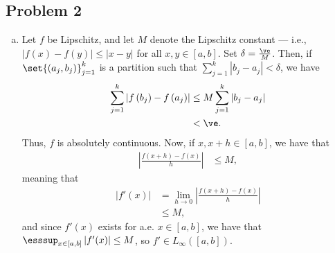 \documentclass[10pt]{mypackage}
\begin{document}
\subsection{Problem 2}%
\begin{enumerate}[(a)]
  \item Let $f$ be Lipschitz, and let $M$ denote the Lipschitz constant --- i.e., $\left\vert f(x)-f(y) \right\vert\leq \left\vert x-y \right\vert$ for all $x,y\in [a,b]$. Set $\delta = \frac{\ve}{M}$. Then, if $\set{\left( a_j,b_j \right)}_{j=1}^{k}$ is a partition such that $\sum_{j=1}^{k}\left\vert b_j-a_j \right\vert < \delta$, we have
    \begin{align*}
      \sum_{j=1}^{k} \left\vert f\left(b_j\right)-f\left( a_j \right) \right\vert &\leq M\sum_{j=1}^{k} \left\vert b_j-a_j \right\vert\\
                                                                                  &< \ve.
    \end{align*}
    Thus, $f$ is absolutely continuous. Now, if $x,x+h\in [a,b]$, we have that
    \begin{align*}
      \left\vert \frac{f\left( x+h \right)-f\left( x \right)}{h} \right\vert &\leq M,
    \end{align*}
    meaning that
    \begin{align*}
      \left\vert f'(x) \right\vert &= \lim_{h\rightarrow 0} \left\vert \frac{f\left( x+h \right)-f(x)}{h} \right\vert\\
                                   &\leq M,
    \end{align*}
    and since $f'(x)$ exists for a.e. $x\in [a,b]$, we have that $\esssup_{x\in [a,b]} \left\vert f'(x) \right\vert \leq M$, so $f'\in L_{\infty}\left( [a,b] \right)$.\newline


\end{enumerate}
\end{document}
